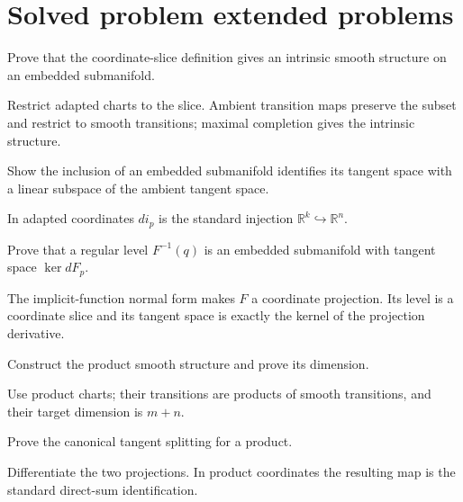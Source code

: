 \section{Solved problem extended problems}
\begin{problem}\label{prob:vii06-01}
Prove that the coordinate-slice definition gives an intrinsic smooth structure on an embedded submanifold.
\end{problem}
\begin{solution}
Restrict adapted charts to the slice. Ambient transition maps preserve the subset and restrict to smooth transitions; maximal completion gives the intrinsic structure.
\end{solution}

\begin{problem}\label{prob:vii06-02}
Show the inclusion of an embedded submanifold identifies its tangent space with a linear subspace of the ambient tangent space.
\end{problem}
\begin{solution}
In adapted coordinates \(di_p\) is the standard injection \(\mathbb R^k\hookrightarrow\mathbb R^n\).
\end{solution}

\begin{problem}\label{prob:vii06-03}
Prove that a regular level \(F^{-1}(q)\) is an embedded submanifold with tangent space \(\ker dF_p\).
\end{problem}
\begin{solution}
The implicit-function normal form makes \(F\) a coordinate projection. Its level is a coordinate slice and its tangent space is exactly the kernel of the projection derivative.
\end{solution}

\begin{problem}\label{prob:vii06-04}
Construct the product smooth structure and prove its dimension.
\end{problem}
\begin{solution}
Use product charts; their transitions are products of smooth transitions, and their target dimension is \(m+n\).
\end{solution}

\begin{problem}\label{prob:vii06-05}
Prove the canonical tangent splitting for a product.
\end{problem}
\begin{solution}
Differentiate the two projections. In product coordinates the resulting map is the standard direct-sum identification.
\end{solution}

